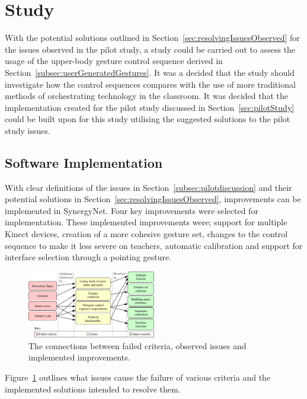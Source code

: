 \documentclass[link]{IWCOMP}
\begin{document}
\section{Study}
\label{sec:study}

With the potential solutions outlined in Section~\ref{sec:resolvingIssuesObserved} for the issues observed in the pilot study, a study could be carried out to assess the usage of the upper-body gesture control sequence derived in Section~\ref{subsec:userGeneratedGestures}.
It was a decided that the study should investigate how the control sequences compares with the use of more traditional methods of orchestrating technology in the classroom.
It was decided that the implementation created for the pilot study discussed in Section~\ref{sec:pilotStudy} could be built upon for this study utilising the suggested solutions to the pilot study issues.

\subsection{Software Implementation}
\label{subsec:studyImplementation}


With clear definitions of the issues in Section~\ref{subsec:pilotdiscussion} and their potential solutions in Section~\ref{sec:resolvingIssuesObserved}, improvements can be implemented in SynergyNet.
Four key improvements were selected for implementation.
These implemented improvements were; support for multiple Kinect devices, creation of a more cohesive gesture set, changes to the control sequence to make it less severe on teachers, automatic calibration and support for interface selection through a pointing gesture.

\begin{figure}[h]
  \centering
  \includegraphics[width=0.5\textwidth]{figures/issue_flow_diagram.png}
  \caption{The connections between failed criteria, observed issues and implemented improvements.}
  \label{fig:issueFlow}
\end{figure}

Figure~\ref{fig:issueFlow} outlines what issues cause the failure of various criteria and the implemented solutions intended to resolve them.
\end{document}
